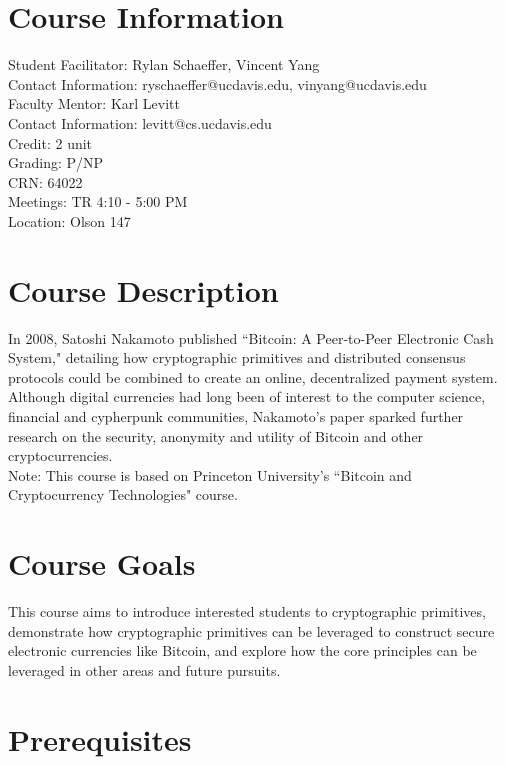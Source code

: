 \documentclass{article}
\begin{document}
\maketitle

\section*{Course Information}
Student Facilitator: Rylan Schaeffer, Vincent Yang\\
Contact Information: ryschaeffer@ucdavis.edu, vinyang@ucdavis.edu\\
Faculty Mentor: Karl Levitt\\
Contact Information: levitt@cs.ucdavis.edu\\
Credit: 2 unit\\
Grading: P/NP \\
CRN: 64022 \\
Meetings: TR 4:10 - 5:00 PM \\
Location: Olson 147 


\section*{Course Description}

In 2008, Satoshi Nakamoto published ``Bitcoin: A Peer-to-Peer Electronic Cash System," detailing how cryptographic primitives and distributed consensus protocols could be combined to create an online, decentralized payment system. Although digital currencies had long been of interest to the computer science, financial and cypherpunk communities, Nakamoto's paper sparked further research on the security, anonymity and utility of Bitcoin and other cryptocurrencies.\\

\noindent Note: This course is based on Princeton University's ``Bitcoin and Cryptocurrency Technologies" course.

\section*{Course Goals}

This course aims to introduce interested students to cryptographic primitives, demonstrate how cryptographic primitives can be leveraged to construct secure electronic currencies like Bitcoin, and explore how the core principles can be leveraged in other areas and future pursuits.

\section*{Prerequisites}
\end{document}
